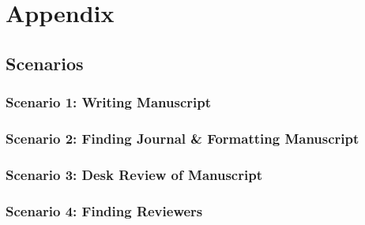\section{Appendix}

\subsection{Scenarios}


\subsubsection{Scenario 1: Writing Manuscript}

\subsubsection{Scenario 2: Finding Journal \& Formatting Manuscript}

\subsubsection{Scenario 3: Desk Review of Manuscript}

\subsubsection{Scenario 4: Finding Reviewers}
